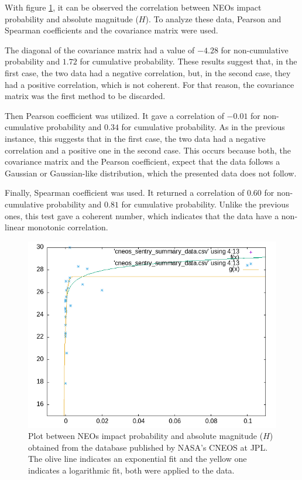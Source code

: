 \documentclass[
	a4paper, %
	10pt, %
	unnumberedsections, %
	twoside, %
]{LTJournalArticle}
\begin{document}
With figure \ref{fig:probability}, it can be observed the correlation between NEOs impact probability
and absolute magnitude ($H$). To analyze these data, Pearson and Spearman coefficients and the
covariance matrix were used. 

The diagonal of the covariance matrix had a value of $-4.28$ for non-cumulative probability and $1.72$
for cumulative probability. These results suggest that, in the first case, the two data had a negative
correlation, but, in the second case, they had a positive correlation, which is not coherent. For that
reason, the covariance matrix was the first method to be discarded.

Then Pearson coefficient was utilized. It gave a correlation of $-0.01$ for non-cumulative
probability and $0.34$ for cumulative probability. As in the previous instance, this suggests that
in the first case, the two data had a negative correlation and a positive one in the second case. This
occurs because both, the covariance matrix and the Pearson coefficient, expect that the data follows
a Gaussian or Gaussian-like distribution, which the presented data does not follow.

Finally, Spearman coefficient was used. It returned a correlation of $0.60$ for non-cumulative
probability and $0.81$ for cumulative probability. Unlike the previous ones, this test gave a
coherent number, which indicates that the data have a non-linear monotonic correlation.

\begin{figure}[H] %
	\includegraphics[width=\linewidth]{correlation.png}
	\caption{Plot between NEOs impact probability and absolute magnitude ($H$) obtained from the database published by NASA’s CNEOS at JPL. The olive line indicates an exponential fit and the yellow one indicates a logarithmic fit, both were applied to the data.}
	\label{fig:probability}
\end{figure}
\end{document}
